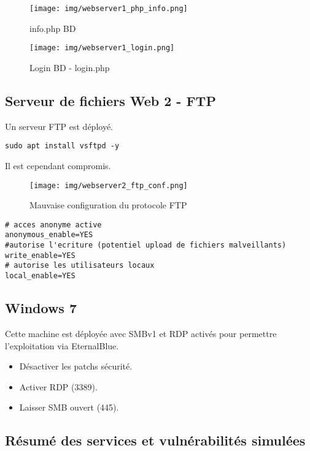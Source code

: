 \documentclass[a4paper,12pt]{report}
\begin{document}
\begin{figure}[H] 
\label{web1-php-info}
    \centering
    \texttt{[image: img/webserver1\_php\_info.png]} 
    \caption{info.php BD }
\end{figure}

\begin{figure}[H] 
\label{web1-php-login}
    \centering
    \texttt{[image: img/webserver1\_login.png]} 
    \caption{Login BD - login.php }
\end{figure}


\subsection{Serveur de fichiers Web 2 - FTP}
Un serveur FTP  est déployé.

\begin{lstlisting}
sudo apt install vsftpd -y
\end{lstlisting}

Il est cependant compromis. 


\begin{figure}[H] 
\label{config-ftp}
    \centering
    \texttt{[image: img/webserver2\_ftp\_conf.png]} 
    \caption{Mauvaise configuration du protocole FTP }
\end{figure}

\begin{lstlisting}
# acces anonyme active
anonymous_enable=YES
#autorise l'ecriture (potentiel upload de fichiers malveillants)
write_enable=YES
# autorise les utilisateurs locaux
local_enable=YES
\end{lstlisting}

\subsection{Windows 7 }
Cette machine est déployée avec SMBv1 et RDP activés pour permettre l’exploitation via EternalBlue.

\begin{itemize}
    \item Désactiver les patchs sécurité.
    \item Activer RDP (3389).
    \item Laisser SMB ouvert (445).
\end{itemize}

\subsection{Résumé des services et vulnérabilités simulées}
\end{document}
